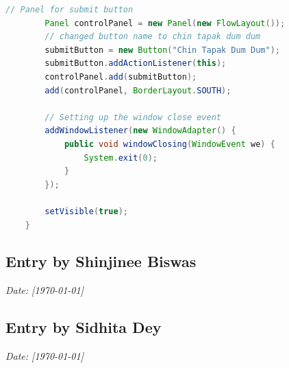 \documentclass[12pt, a4paper]{article}
\begin{document}
\begin{lstlisting}[language=Java, caption=Java Swing Application Code]
        // Panel for submit button
        Panel controlPanel = new Panel(new FlowLayout());
        // changed button name to chin tapak dum dum
        submitButton = new Button("Chin Tapak Dum Dum"); 
        submitButton.addActionListener(this);
        controlPanel.add(submitButton);
        add(controlPanel, BorderLayout.SOUTH);

        // Setting up the window close event
        addWindowListener(new WindowAdapter() {
            public void windowClosing(WindowEvent we) {
                System.exit(0);
            }
        });

        setVisible(true);
    }
\end{lstlisting}


\newpage
{}
\vspace{-2cm}
\subsection*{Entry by Shinjinee Biswas}
\textit{Date: [\today]}\\

\newpage
{}
\vspace{-2cm}
\subsection*{Entry by Sidhita Dey}
\textit{Date: [\today]}\\
\end{document}
